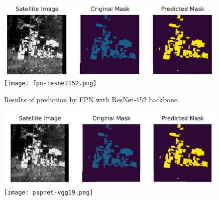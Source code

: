 \documentclass[a4paper,12pt]{spieman}  %
\begin{document}
\begin{spacing}{1}
\begin{figure}[!htbp]
	\centering
	\includegraphics[width=\textwidth]{fpn.png}
 	\texttt{[image: fpn-resnet152.png]}
	\caption{\label{fig:fpn}Results of prediction by FPN with ResNet-152 backbone.}
\end{figure}
\begin{figure}[!htbp]
	\centering
	\includegraphics[width=\textwidth]{pspnet.PNG}
	\texttt{[image: pspnet-vgg19.png]}


\end{figure}
\end{spacing}
\end{document}
